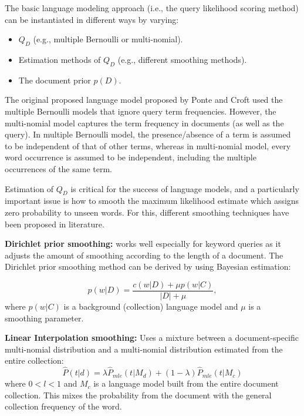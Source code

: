 \documentclass[draftcls, onecolumn, 11pt]{IEEEtran}
\begin{document}
The basic language modeling approach (i.e., the query likelihood scoring method) can be instantiated in different ways by varying:
\begin{itemize}
\item $Q_D$ (e.g., multiple Bernoulli or multi-nomial).
\item Estimation methods of $Q_D$ (e.g., different smoothing methods).
\item The document prior $p(D)$.
\end{itemize}

The original proposed language model proposed by Ponte and Croft used the multiple Bernoulli models that ignore query term frequencies. However, the multi-nomial model captures the term frequency in documents (as well as the query). In multiple Bernoulli model, the presence/absence of a term is assumed to be independent of that of other terms, whereas in multi-nomial model, every word occurrence is assumed to be independent, including the multiple occurrences of the same term.


Estimation of $Q_D$ is critical for the success of language models, and a particularly important issue is how to smooth the maximum likelihood estimate which assigns zero probability to unseen words. For this, different smoothing techniques have been proposed in literature.

\vspace{8pt}
\textbf{Dirichlet prior smoothing:} works well especially for keyword queries as it adjusts the amount of smoothing according to the length of a document. The Dirichlet prior smoothing method can be derived by using Bayesian estimation:

\begin{equation}
p(w|D)= \frac{c(w|D)+ \mu p(w|C)}{|D|+\mu},
\end{equation}
\noindent where $p(w|C)$ is a background (collection) language model and $\mu$ is a smoothing parameter.

\vspace{8pt}
\textbf{Linear Interpolation smoothing:} Uses a mixture between a document-specific multi-nomial distribution and a multi-nomial distribution estimated from the entire collection:
\begin{equation}
\hat{P}(t|d)=\lambda \hat{P}_{mle}(t|M_d)+(1-\lambda)\hat{P}_{mle}(t|M_c)
\end{equation}
\noindent where $0 < l < 1$ and $M_c$ is a language model built from the entire document collection. This mixes the probability from the document with the general collection frequency of the word.
\end{document}
